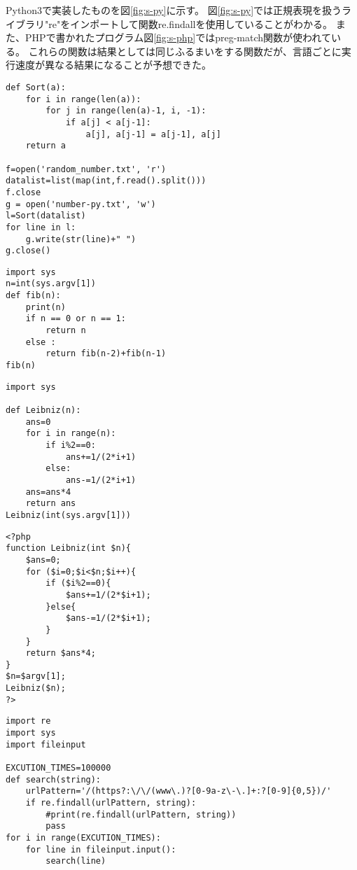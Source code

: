 Python3で実装したものを図\ref{fig:s-py}に示す。
図\ref{fig:s-py}では正規表現を扱うライブラリ"re"をインポートして関数re.findallを使用していることがわかる。
また、PHPで書かれたプログラム図\ref{fig:s-php}ではpreg-match関数が使われている。
これらの関数は結果としては同じふるまいをする関数だが、言語ごとに実行速度が異なる結果になることが予想できた。

\clearpage
\begin{lstlisting}[label={fig:b-rb}, caption={Python3 バブルソート}, basicstyle=\ttfamily\footnotesize, frame=single]
def Sort(a):
    for i in range(len(a)):
        for j in range(len(a)-1, i, -1):
            if a[j] < a[j-1]:
                a[j], a[j-1] = a[j-1], a[j]
    return a

f=open('random_number.txt', 'r')
datalist=list(map(int,f.read().split()))
f.close
g = open('number-py.txt', 'w')
l=Sort(datalist)
for line in l:
    g.write(str(line)+" ")
g.close()
\end{lstlisting}

\begin{lstlisting}[label={fig:f-py}, caption={Python3 フィボナッチ数列}, basicstyle=\ttfamily\footnotesize, frame=single]
import sys
n=int(sys.argv[1])
def fib(n):
	print(n)
	if n == 0 or n == 1:
		return n
	else :
		return fib(n-2)+fib(n-1)
fib(n)
\end{lstlisting}

\clearpage

\begin{lstlisting}[label={fig:p-py}, caption={Python3 円周率の算出}, basicstyle=\ttfamily\footnotesize, frame=single]
import sys

def Leibniz(n):
    ans=0
    for i in range(n):
        if i%2==0:
            ans+=1/(2*i+1)
        else:
            ans-=1/(2*i+1)
    ans=ans*4
    return ans
Leibniz(int(sys.argv[1]))
\end{lstlisting}

\begin{lstlisting}[label={fig:p-php}, caption={PHP 円周率の算出}, basicstyle=\ttfamily\footnotesize, frame=single]
<?php
function Leibniz(int $n){
    $ans=0;
    for ($i=0;$i<$n;$i++){
        if ($i%2==0){
            $ans+=1/(2*$i+1);
        }else{
            $ans-=1/(2*$i+1);
        }
    }
    return $ans*4;
}
$n=$argv[1];
Leibniz($n);
?>
\end{lstlisting}

\clearpage

\begin{lstlisting}[label={fig:s-py}, caption={Python3 正規表現}, basicstyle=\ttfamily\footnotesize, frame=single]
import re
import sys
import fileinput

EXCUTION_TIMES=100000
def search(string):
    urlPattern='/(https?:\/\/(www\.)?[0-9a-z\-\.]+:?[0-9]{0,5})/'
    if re.findall(urlPattern, string):
        #print(re.findall(urlPattern, string))
        pass
for i in range(EXCUTION_TIMES):
    for line in fileinput.input():
        search(line)
\end{lstlisting}

